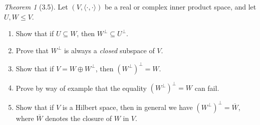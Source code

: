 \documentclass[12pt]{article}
\theoremstyle{remark}
\theoremstyle{named}
\newtheorem*{theorem}{Theorem}
\begin{document}
\begin{theorem}[3.5]
    Let \((V, \langle \cdot, \cdot \rangle)\) be a real or complex inner product space, and let \(U, W \leq V\).
    \begin{enumerate}
        \item Show that if \(U \subseteq W\), then \(W^\perp \subseteq U^\perp\).
        \item Prove that \(W^\perp\) is always a \textit{closed} subspace of \(V\).
        \item Show that if \(V = W \oplus W^\perp\), then \((W^\perp)^\perp = W\).
        \item Prove by way of example that the equality \((W^\perp)^\perp = W\) can fail.
        \item Show that if \(V\) is a Hilbert space, then in general we have \((W^\perp)^\perp = \overline W\), where \(\overline W\) denotes the closure of \(W\) in \(V\). 
    \end{enumerate}
\end{theorem}
\end{document}
